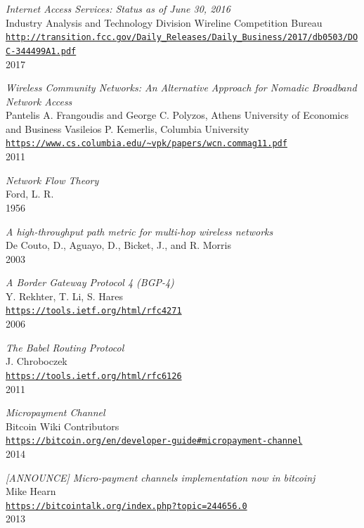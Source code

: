 \documentclass[11pt]{article}
\begin{document}
\begin{thebibliography}{99}

\emph{Internet Access Services: Status as of June 30, 2016}\\
Industry Analysis and Technology Division Wireline Competition Bureau\\
\texttt{\url{http://transition.fcc.gov/Daily_Releases/Daily_Business/2017/db0503/DOC-344499A1.pdf}}\\
2017

\emph{Wireless Community Networks:
An Alternative Approach for Nomadic Broadband Network Access}\\
Pantelis A. Frangoudis and George C. Polyzos, Athens University of Economics and Business Vasileios P. Kemerlis, Columbia University\\
\texttt{\url{https://www.cs.columbia.edu/~vpk/papers/wcn.commag11.pdf}}\\
2011

\emph{Network Flow Theory}\\
Ford, L. R.\\
1956

\emph{A high-throughput path metric for multi-hop wireless networks}\\
De Couto, D., Aguayo, D., Bicket, J., and R. Morris\\
2003

\emph{A Border Gateway Protocol 4 (BGP-4)}\\
Y. Rekhter, T. Li, S. Hares\\
\texttt{\url{https://tools.ietf.org/html/rfc4271}}\\
2006

\emph{The Babel Routing Protocol}\\
J. Chroboczek\\
\texttt{\url{https://tools.ietf.org/html/rfc6126}}\\
2011

\emph{Micropayment Channel}\\
Bitcoin Wiki Contributors\\
\texttt{\url{https://bitcoin.org/en/developer-guide\#micropayment-channel}}\\
2014

\emph{[ANNOUNCE] Micro-payment channels implementation now in bitcoinj}\\
Mike Hearn\\
\texttt{\url{https://bitcointalk.org/index.php?topic=244656.0}}\\
2013


\end{thebibliography}
\end{document}
